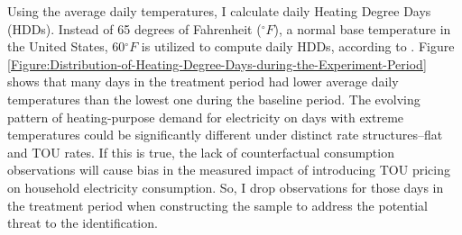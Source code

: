 Using the average daily temperatures, I calculate daily Heating Degree Days (HDDs). Instead of 65 degrees of Fahrenheit ($^{\circ}F$), a normal base temperature in the United States, 60$^{\circ}F$ is utilized to compute daily HDDs, according to \cite{The-Impacts-of-Climate-Change-on-Domestic-Natural-Gas-Consumption-in-the-Greater-Dublin-Region_Liu-and-Sweeney_2012}. Figure \ref{Figure:Distribution-of-Heating-Degree-Days-during-the-Experiment-Period} shows that many days in the treatment period had lower average daily temperatures than the lowest one during the baseline period. The evolving pattern of heating-purpose demand for electricity on days with extreme temperatures could be significantly different under distinct rate structures--flat and TOU rates. If this is true, the lack of counterfactual consumption observations will cause bias in the measured impact of introducing TOU pricing on household electricity consumption. So, I drop observations for those days in the treatment period when constructing the sample to address the potential threat to the identification. 

